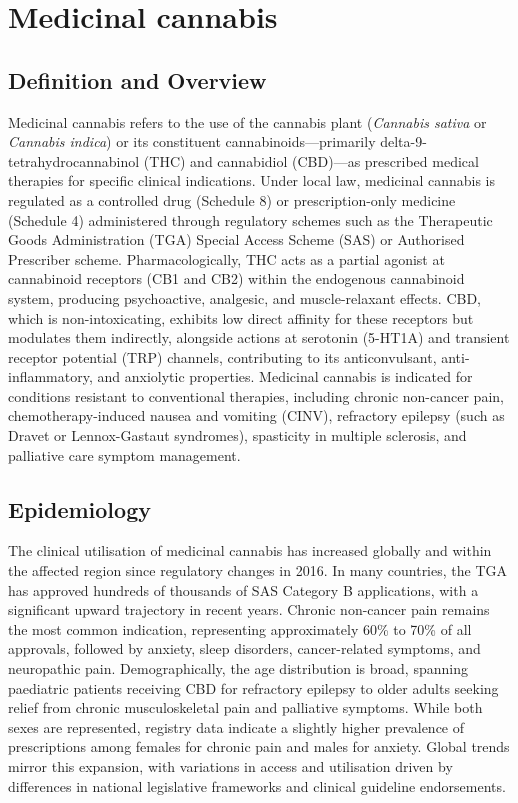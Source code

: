 \chapter{Medicinal cannabis}

\section*{Definition and Overview}
Medicinal cannabis refers to the use of the cannabis plant (\textit{Cannabis sativa} or \textit{Cannabis indica}) or its constituent cannabinoids—primarily delta-9-tetrahydrocannabinol (THC) and cannabidiol (CBD)—as prescribed medical therapies for specific clinical indications. Under local law, medicinal cannabis is regulated as a controlled drug (Schedule 8) or prescription-only medicine (Schedule 4) administered through regulatory schemes such as the Therapeutic Goods Administration (TGA) Special Access Scheme (SAS) or Authorised Prescriber scheme. Pharmacologically, THC acts as a partial agonist at cannabinoid receptors (CB1 and CB2) within the endogenous cannabinoid system, producing psychoactive, analgesic, and muscle-relaxant effects. CBD, which is non-intoxicating, exhibits low direct affinity for these receptors but modulates them indirectly, alongside actions at serotonin (5-HT1A) and transient receptor potential (TRP) channels, contributing to its anticonvulsant, anti-inflammatory, and anxiolytic properties. Medicinal cannabis is indicated for conditions resistant to conventional therapies, including chronic non-cancer pain, chemotherapy-induced nausea and vomiting (CINV), refractory epilepsy (such as Dravet or Lennox-Gastaut syndromes), spasticity in multiple sclerosis, and palliative care symptom management.

\section*{Epidemiology}
The clinical utilisation of medicinal cannabis has increased globally and within the affected region since regulatory changes in 2016. In many countries, the TGA has approved hundreds of thousands of SAS Category B applications, with a significant upward trajectory in recent years. Chronic non-cancer pain remains the most common indication, representing approximately 60\% to 70\% of all approvals, followed by anxiety, sleep disorders, cancer-related symptoms, and neuropathic pain. Demographically, the age distribution is broad, spanning paediatric patients receiving CBD for refractory epilepsy to older adults seeking relief from chronic musculoskeletal pain and palliative symptoms. While both sexes are represented, registry data indicate a slightly higher prevalence of prescriptions among females for chronic pain and males for anxiety. Global trends mirror this expansion, with variations in access and utilisation driven by differences in national legislative frameworks and clinical guideline endorsements.

